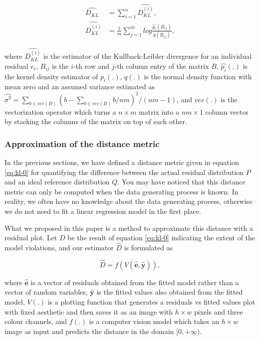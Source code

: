 \documentclass[]{interact}
\theoremstyle{plain}%
\theoremstyle{definition}
\theoremstyle{remark}
\begin{document}
\begin{align}
\label{eq:kl-3}
\widehat{D_{KL}} &= \sum_{i = 1}^{n} \widehat{D_{KL}^{(i)}}, \\
\widehat{D_{KL}^{(i)}} &= \frac{1}{m}\sum_{j = 1}^{m} log\frac{\hat{p_i}(B_{ij})}{q(B_{ij})},
\end{align}

\noindent where \(\widehat{D_{KL}^{(i)}}\) is the estimator of the
Kullback-Leibler divergence for an individual residual \(e_i\),
\(B_{ij}\) is the \(i\)-th row and \(j\)-th column entry of the matrix
\(B\), \(\hat{p_i}(.)\) is the kernel density estimator of \(p_i(.)\),
\(q(.)\) is the normal density function with mean zero and an assumed
variance estimated as
\(\widehat{\sigma^2} = \sum_{b \in vec(B)}(b - \sum_{b \in vec(B)} b/nm)^2/(nm - 1)\),
and \(vec(.)\) is the vectorization operator which turns a
\(n \times m\) matrix into a \(nm \times 1\) column vector by stacking
the columns of the matrix on top of each other.

\hypertarget{approximation-of-the-distance-metric}{%
\subsubsection{Approximation of the distance
metric}\label{approximation-of-the-distance-metric}}

In the previous sections, we have defined a distance metric given in
equation \ref{eq:kl-0} for quantifying the difference between the actual
residual distribution \(P\) and an ideal reference distribution \(Q\).
You may have noticed that this distance metric can only be computed when
the data generating process is known. In reality, we often have no
knowledge about the data generating process, otherwise we do not need to
fit a linear regression model in the first place.

What we proposed in this paper is a method to approximate this distance
with a residual plot. Let \(D\) be the result of equation \ref{eq:kl-0}
indicating the extent of the model violations, and our estimator
\(\hat{D}\) is formulated as

\begin{equation}
\label{eq:d-approx}
\hat{D} = f(V(\hat{\boldsymbol{e}}, \hat{\boldsymbol{y}})),
\end{equation}

\noindent where \(\hat{\boldsymbol{e}}\) is a vector of residuals
obtained from the fitted model rather than a vector of random variables,
\(\hat{\boldsymbol{y}}\) is the fitted values also obtained from the
fitted model, \(V(.)\) is a plotting function that generates a residuals
vs fitted values plot with fixed aesthetic and then saves it as an image
with \(h \times w\) pixels and three colour channels, and \(f(.)\) is a
computer vision model which takes an \(h \times w\) image as input and
predicts the distance in the domain \([0, +\infty)\).
\end{document}

